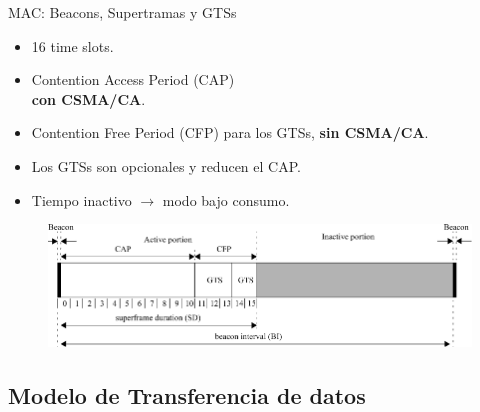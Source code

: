 \documentclass[aspectratio=169]{beamer}
\begin{document}
\begin{frame}[t]{MAC: Beacons, Supertramas y GTSs}
\begin{minipage}[c]{1.0\linewidth}
\begin{minipage}[c]{0.35\linewidth}
		\begin{itemize}
			\item 16 time slots.
			\vspace{5px}
			\item Contention Access Period (CAP)\\ \textbf{con CSMA/CA}.
			\vspace{5px}
			\item Contention Free Period (CFP) para los GTSs, \textbf{sin CSMA/CA}.
			\vspace{5px}
			\item Los GTSs son opcionales y reducen el CAP.
			\vspace{5px}
			\item Tiempo inactivo $\rightarrow$ modo bajo consumo.
		\end{itemize}	
	\end{minipage}
	\begin{minipage}[c]{0.65\linewidth}
		\begin{figure}[H]
			\includegraphics[width=1\linewidth]{./imagenes/superFrame}\\
		\end{figure}	  	  	
	\end{minipage}
\end{minipage}

\end{frame}

\subsection[Transferencia de datos]{Modelo de Transferencia de datos}
\end{document}
